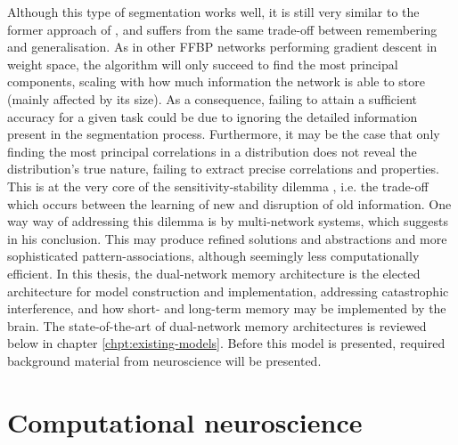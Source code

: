 Although this type of segmentation works well, it is still very similar to the former approach of \cite{French1992}, and suffers from the same trade-off between remembering and generalisation. As in other FFBP networks performing gradient descent in weight space, the algorithm will only succeed to find the most principal components, scaling with how much information the network is able to store (mainly affected by its size). As a consequence, failing to attain a sufficient accuracy for a given task could be due to ignoring the detailed information present in the segmentation process. Furthermore, it may be the case that only finding the most principal correlations in a distribution does not reveal the distribution's true nature, failing to extract precise correlations and properties. This is at the very core of the sensitivity-stability dilemma \citep{Hebb1949}, i.e. the trade-off which occurs between the learning of new and disruption of old information. One way way of addressing this dilemma is by multi-network systems, which \cite{French1994} suggests in his conclusion. This may produce refined solutions and abstractions and more sophisticated pattern-associations, although seemingly less computationally efficient. In this thesis, the dual-network memory architecture \citep{McClelland1995} is the elected architecture for model construction and implementation, addressing catastrophic interference, and how short- and long-term memory may be implemented by the brain. The state-of-the-art of dual-network memory architectures is reviewed below in chapter \ref{chpt:existing-models}. Before this model is presented, required background material from neuroscience will be presented.


\section{Computational neuroscience}

